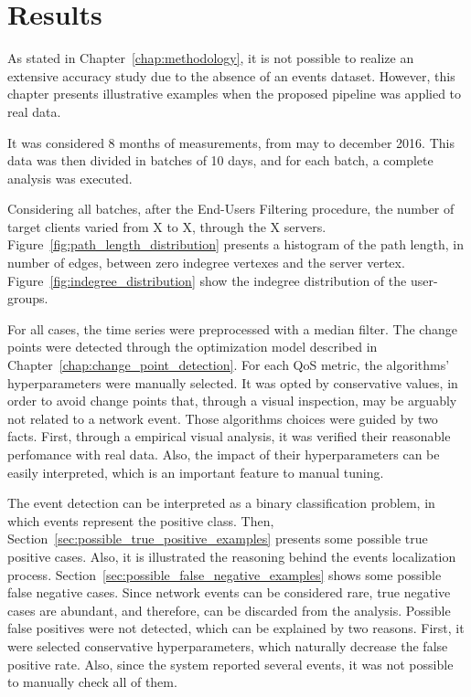 \chapter{Results}
\label{chap:results}

As stated in Chapter~\ref{chap:methodology}, it is not possible to realize an
extensive accuracy study due to the absence of an events dataset.
However, this chapter presents illustrative examples when the proposed pipeline
was applied to real data.

It was considered 8 months of measurements, from may to december 2016.
This data was then divided in batches of 10 days, and for each batch,
a complete analysis was executed.

Considering all batches, after the End-Users Filtering procedure,
the number of target clients varied from X to X, through the X servers.
Figure~\ref{fig:path_length_distribution} presents a histogram of the path
length, in number of edges, between zero indegree vertexes and the server
vertex. Figure~\ref{fig:indegree_distribution} show the indegree distribution
of the user-groups.

For all cases, the time series were preprocessed with a median filter.
The change points were detected through the optimization model described in
Chapter~\ref{chap:change_point_detection}.
For each QoS metric, the algorithms' hyperparameters were manually selected.
It was opted by conservative values, in order to avoid change points that,
through a visual inspection, may be arguably not related to a network event.
Those algorithms choices were guided by two facts.
First, through a empirical visual analysis,
it was verified their reasonable perfomance with real data.
Also, the impact of their hyperparameters can be easily interpreted, which is
an important feature to manual tuning.

The event detection can be interpreted as a binary classification problem, in
which events represent the positive class.
Then, Section~\ref{sec:possible_true_positive_examples} presents some
possible true positive cases.
Also, it is illustrated the reasoning behind the events localization process.
Section~\ref{sec:possible_false_negative_examples} shows some possible false
negative cases.
Since network events can be considered rare, true negative cases are abundant,
and therefore, can be discarded from the analysis.
Possible false positives were not detected, which can be explained by two
reasons. First, it were selected conservative hyperparameters, which naturally
decrease the false positive rate. Also, since the system reported
several events, it was not possible to manually check all of them.

